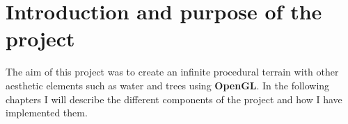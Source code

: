\section{Introduction and purpose of the project}
The aim of this project was to create an infinite procedural terrain with other aesthetic elements such as water and trees using \textbf{OpenGL}.
In the following chapters I will describe the different components of the project and how I have implemented them.
\newpage
